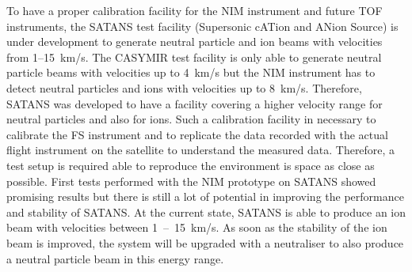 	To have a proper calibration facility for the NIM instrument and future TOF instruments, the SATANS test facility (Supersonic cATion and ANion Source) is under development to generate neutral particle and ion beams with velocities from 1--15~km/s. The CASYMIR test facility is only able to generate neutral particle beams with velocities up to 4~km/s but the NIM instrument has to detect neutral particles and ions with velocities up to 8~km/s. Therefore, SATANS was developed to have a facility covering a higher velocity range for neutral particles and also for ions. Such a calibration facility in necessary to calibrate the FS instrument and to replicate the data recorded with the actual flight instrument on the satellite to understand the measured data. Therefore, a test setup is required able to reproduce the environment is space as close as possible. First tests performed with the NIM prototype on SATANS showed promising results \cite{SATANS_Meyer2018} but there is still a lot of potential in improving the performance and stability of SATANS. At the current state, SATANS is able to produce an ion beam with velocities between 1~--~15~km/s. As soon as the stability of the ion beam is improved, the system will be upgraded with a neutraliser to also produce a neutral particle beam in this energy range.
	
	
	
	
	
	
	
	
	
	
	
	
	
	
	
	
	
	
	